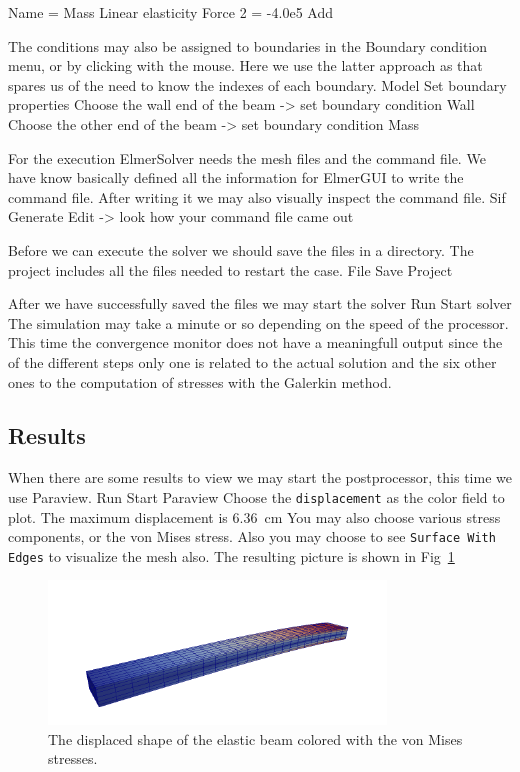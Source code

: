     Name = Mass
    Linear elasticity 
      Force 2 = -4.0e5
    Add 
\ttend   

The conditions may also be assigned to boundaries in the Boundary condition menu, or 
by clicking with the mouse. Here we use the latter approach as that spares us of the 
need to know the indexes of each boundary. 
\ttbegin
Model
  Set boundary properties
    Choose the wall end of the beam -> set boundary condition Wall
    Choose the other end of the beam -> set boundary condition Mass
\ttend

For the execution 
ElmerSolver needs the mesh files and the command file. We have know basically defined
all the information for ElmerGUI to write the command file. After writing it we may also visually 
inspect the command file.
\ttbegin
Sif 
  Generate
  Edit -> look how your command file came out  
\ttend

Before we can execute the solver we should save the files in a directory. The project includes
all the files needed to restart the case.
\ttbegin
File 
  Save Project
\ttend

After we have successfully saved the files we may start the solver
\ttbegin
Run
  Start solver
\ttend
The simulation may take a minute or so depending on the 
speed of the processor.
This time the convergence monitor does not have a meaningfull output since the 
of the different steps only one is related to the actual solution and the six other
ones to the computation of stresses with the Galerkin method.


\subsection*{Results}

When there are some results to view we may start the postprocessor, this time we use Paraview.
\ttbegin
Run
  Start Paraview
\ttend
Choose the \texttt{displacement} as the color field to plot.
The maximum displacement is $6.36$~cm 
You may also choose various stress components, or the von Mises stress.
Also you may choose to see \texttt{Surface With Edges} to visualize the mesh also. 
The resulting picture is shown in Fig~\ref{fig:beam_stresses}
\begin{figure}[h!]
\begin{center}
  \includegraphics[width=0.8\textwidth]{beam_vonMises}
  \caption{The displaced shape of the elastic beam colored with the 
  von Mises stresses.}
  \label{fig:beam_stresses}
\end{center}
\end{figure}

